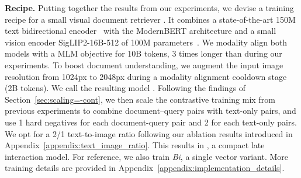 \noindent\textbf{Recipe.} Putting together the results from our experiments, we devise a training recipe for a small visual document retriever \flagship{}. It combines a state-of-the-art 150M text bidirectional encoder~\citep{weller2025seqvsseqopen} with the ModernBERT architecture \citep{modernbert} and a small vision encoder SigLIP2-16B-512 of 100M parameters~\citep{tschannen2025siglip2multilingualvisionlanguage}. We modality align both models with a MLM objective for 10B tokens, 3 times longer than during our experiments. To boost document understanding, we augment the input image resolution from 1024px to 2048px during a modality alignment cooldown stage (2B tokens). We call the resulting model \flagship{}.
Following the findings of Section~\ref{sec:scaling=-cont}, we then scale the contrastive training mix from previous experiments to combine document–query pairs with text-only pairs, and use 1 hard negatives for each document-query pair and 2 for each text-only pairs. We opt for a 2/1 text-to-image ratio following our ablation results introduced in Appendix~\ref{appendix:text_image_ratio}. This results in \colflagship{}, a compact late interaction model. For reference, we also train \textit{Bi}\flagship{}, a single vector variant. More training details are provided in Appendix~\ref{appendix:implementation_details}.


